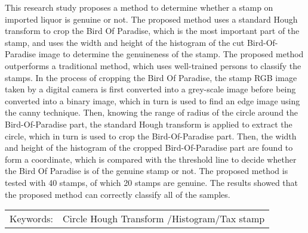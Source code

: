 \abstract

This research study proposes a method to determine whether a stamp on imported liquor is genuine or not. The proposed method uses a standard Hough transform to crop the Bird Of Paradise, which is the most important part of the stamp, and uses the width and height of the histogram of the cut Bird-Of-Paradise image to determine the genuineness of the stamp. The proposed method outperforms a traditional method, which uses well-trained persons to classify the stamps. In the process of cropping the Bird Of Paradise, the stamp RGB image taken by a digital camera is first converted into a grey-scale image before being converted into a binary image, which in turn is used to find an edge image using the canny technique. Then, knowing the range of radius of the circle around the Bird-Of-Paradise part, the standard Hough transform is applied to extract the circle, which in turn is used to crop the Bird-Of-Paradise part. Then, the width and height of the histogram of the cropped Bird-Of-Paradise part are found to form a coordinate, which is compared with the threshold line to decide whether the Bird Of Paradise is of the genuine stamp or not. The proposed method is tested with 40 stamps, of which 20 stamps are genuine. The results showed that the proposed method can correctly classify all of the samples.



\begin{flushleft}
\begin{tabular*}{\textwidth}{@{}lp{}}
Keywords: & Circle Hough Transform /Histogram/Tax stamp
\end{tabular*}
\end{flushleft}
